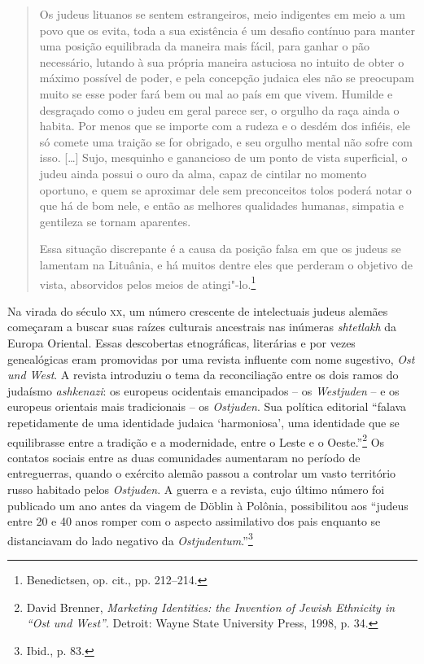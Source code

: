 \begin{quote}
Os judeus lituanos se sentem estrangeiros, meio indigentes em meio a um
povo que os evita, toda a sua existência é um desafio contínuo para
manter uma posição equilibrada da maneira mais fácil, para ganhar o pão
necessário, lutando à sua própria maneira astuciosa no intuito de obter
o máximo possível de poder, e pela concepção judaica eles não se
preocupam muito se esse poder fará bem ou mal ao país em que vivem.
Humilde e desgraçado como o judeu em geral parece ser, o orgulho da raça
ainda o habita. Por menos que se importe com a rudeza e o desdém dos
infiéis, ele só comete uma traição se for obrigado, e seu orgulho mental
não sofre com isso. [\ldots{}] Sujo, mesquinho e ganancioso de um ponto de
vista superficial, o judeu ainda possui o ouro da alma, capaz de
cintilar no momento oportuno, e quem se aproximar dele sem preconceitos
tolos poderá notar o que há de bom nele, e então as melhores qualidades
humanas, simpatia e gentileza se tornam aparentes.

Essa situação discrepante é a causa da posição falsa em que os judeus se
lamentam na Lituânia, e há muitos dentre eles que perderam o objetivo de
vista, absorvidos pelos meios de atingi"-lo.\footnote{Benedictsen, op. cit., pp. 212--214.} 
\end{quote}

Na virada do século \textsc{xx}, um número crescente de intelectuais judeus
alemães começaram a buscar suas raízes culturais ancestrais nas inúmeras
\textit{shtetlakh} da Europa Oriental. Essas descobertas etnográficas,
literárias e por vezes genealógicas eram promovidas por uma revista
influente com nome sugestivo, \textit{Ost und West}. A revista introduziu
o tema da reconciliação entre os dois ramos do judaísmo \textit{ashkenazi}: os
europeus ocidentais emancipados -- os \textit{Westjuden} -- e os europeus
orientais mais tradicionais -- os \textit{Ostjuden}. Sua política editorial
``falava repetidamente de uma identidade judaica `harmoniosa', uma
identidade que se equilibrasse entre a tradição e a modernidade, entre o
Leste e o Oeste.''\footnote{David Brenner, \textit{Marketing Identities: the Invention of Jewish Ethnicity in ``Ost und West''}. Detroit: Wayne State University Press, 1998, p. 34.} Os contatos sociais entre as duas comunidades aumentaram no período de entreguerras, quando o
exército alemão passou a controlar um vasto território russo habitado
pelos \textit{Ostjuden}. A guerra e a revista, cujo último número foi
publicado um ano antes da viagem de Döblin à Polônia, possibilitou aos
``judeus entre 20 e 40 anos romper com o aspecto assimilativo
dos pais enquanto se distanciavam do lado negativo da
\textit{Ostjudentum}.''\footnote{Ibid., p. 83.}

